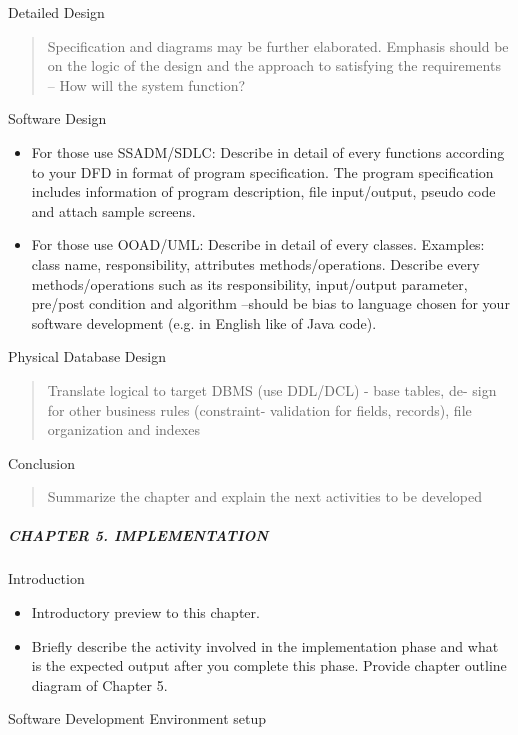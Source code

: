 Detailed Design

\begin{quote}
Specification and diagrams may be further elaborated. Emphasis should be
on the logic of the design and the approach to satisfying the
requirements -- How will the system function?
\end{quote}

Software Design

\begin{itemize}
\item
  For those use SSADM/SDLC: Describe in detail of every functions
  according to your DFD in format of program specification. The program
  specification includes information of program description, file
  input/output, pseudo code and attach sample screens.
\item
  For those use OOAD/UML: Describe in detail of every classes. Examples:
  class name, responsibility, attributes methods/operations. Describe
  every methods/operations such as its responsibility, input/output
  parameter, pre/post condition and algorithm --should be bias to
  language chosen for your software development (e.g. in English like of
  Java code).
\end{itemize}

Physical Database Design

\begin{quote}
Translate logical to target DBMS (use DDL/DCL) - base tables, de- sign
for other business rules (constraint- validation for fields, records),
file organization and indexes
\end{quote}

Conclusion

\begin{quote}
Summarize the chapter and explain the next activities to be developed
\end{quote}

\subparagraph{CHAPTER 5.
IMPLEMENTATION}\label{chapter-5.-implementation}

Introduction

\begin{itemize}
\item
  Introductory preview to this chapter.
\item
  Briefly describe the activity involved in the implementation phase and
  what is the expected output after you complete this phase. Provide
  chapter outline diagram of Chapter 5.
\end{itemize}

Software Development Environment setup

